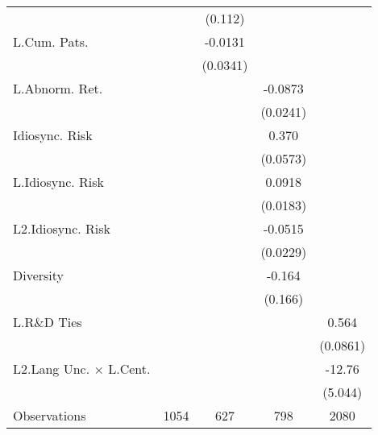 \begin{table}
\begin{center}
{\begin{tabular}{l*{4}{c}}
                    &                     &     (0.112)         &                     &                     \\
L.Cum. Pats.        &                     &     -0.0131         &                     &                     \\
                    &                     &    (0.0341)         &                     &                     \\
L.Abnorm. Ret.      &                     &                     &     -0.0873\sym{***}&                     \\
                    &                     &                     &    (0.0241)         &                     \\
Idiosync. Risk      &                     &                     &       0.370\sym{***}&                     \\
                    &                     &                     &    (0.0573)         &                     \\
L.Idiosync. Risk    &                     &                     &      0.0918\sym{***}&                     \\
                    &                     &                     &    (0.0183)         &                     \\
L2.Idiosync. Risk   &                     &                     &     -0.0515\sym{*}  &                     \\
                    &                     &                     &    (0.0229)         &                     \\
Diversity           &                     &                     &      -0.164         &                     \\
                    &                     &                     &     (0.166)         &                     \\
L.R\&D Ties         &                     &                     &                     &       0.564\sym{***}\\
                    &                     &                     &                     &    (0.0861)         \\
L2.Lang Unc. $\times$ L.Cent.&                     &                     &                     &      -12.76\sym{*}  \\
                    &                     &                     &                     &     (5.044)         \\
\hline
Observations        &        1054         &         627         &         798         &        2080         \\

\end{tabular}}
\end{center}
\end{table}
